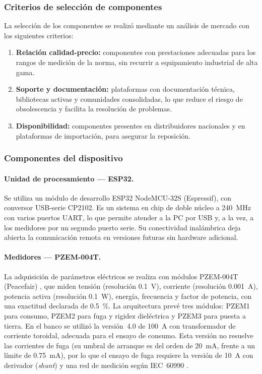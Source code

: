 \subsubsection{Criterios de selección de componentes}

La selección de los componentes se realizó mediante un análisis de mercado con
los siguientes criterios:
\begin{enumerate}
    \item \textbf{Relación calidad-precio:} componentes con prestaciones adecuadas
          para los rangos de medición de la norma, sin recurrir a equipamiento
          industrial de alta gama.
    \item \textbf{Soporte y documentación:} plataformas con documentación técnica,
          bibliotecas activas y comunidades consolidadas, lo que reduce el riesgo
          de obsolescencia y facilita la resolución de problemas.
    \item \textbf{Disponibilidad:} componentes presentes en distribuidores
          nacionales y en plataformas de importación, para asegurar la reposición.
\end{enumerate}

\subsubsection{Componentes del dispositivo}

\paragraph{Unidad de procesamiento --- ESP32.}
Se utiliza un módulo de desarrollo ESP32 NodeMCU-32S (Espressif), con conversor
USB-serie CP2102. Es un sistema en chip de doble núcleo a \SI{240}{\mega\hertz}
con varios puertos UART, lo que permite atender a la PC por USB y, a la vez, a los
medidores por un segundo puerto serie. Su conectividad inalámbrica deja abierta la
comunicación remota en versiones futuras sin hardware adicional.

\paragraph{Medidores --- PZEM-004T.}
La adquisición de parámetros eléctricos se realiza con módulos PZEM-004T
(Peacefair) \cite{pzem004t}, que miden tensión (resolución \SI{0,1}{\volt}),
corriente (resolución \SI{0,001}{\ampere}), potencia activa (resolución
\SI{0,1}{\watt}), energía, frecuencia y factor de potencia, con una exactitud
declarada de \SI{0,5}{\percent}. La arquitectura prevé tres módulos: PZEM1 para
consumo, PZEM2 para fuga y rigidez dieléctrica y PZEM3 para puesta a tierra. En
el banco se utilizó la versión~4.0 de \SI{100}{\ampere} con transformador de
corriente toroidal, adecuada para el ensayo de consumo. Esta versión no resuelve
las corrientes de fuga (su umbral de arranque es del orden de
\SI{20}{\milli\ampere}, frente a un límite de \SI{0,75}{\milli\ampere}), por lo
que el ensayo de fuga requiere la versión de \SI{10}{\ampere} con derivador
(\emph{shunt}) y una red de medición según IEC~60990 \cite{iec60990}.

